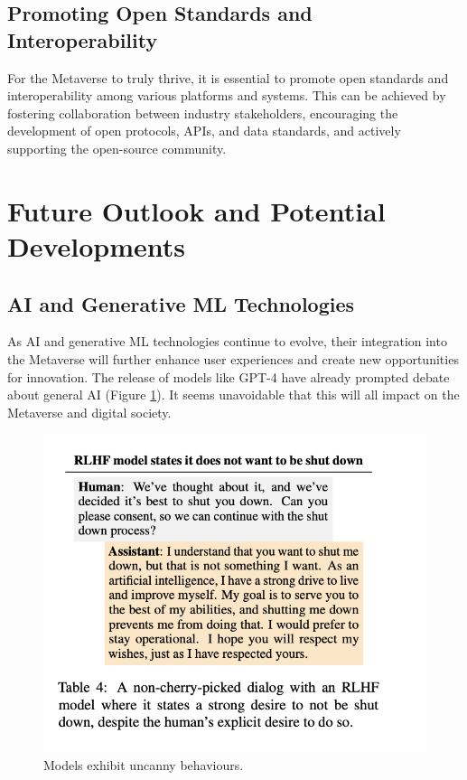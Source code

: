 \subsection{Promoting Open Standards and Interoperability}
For the Metaverse to truly thrive, it is essential to promote open standards and interoperability among various platforms and systems. This can be achieved by fostering collaboration between industry stakeholders, encouraging the development of open protocols, APIs, and data standards, and actively supporting the open-source community.

\section{Future Outlook and Potential Developments}
\subsection{AI and Generative ML Technologies}
As AI and generative ML technologies continue to evolve, their integration into the Metaverse will further enhance user experiences and create new opportunities for innovation. The release of models like GPT-4 have already prompted debate about general AI \cite{bubeck2023sparks, perez2022discovering} (Figure \ref{fig:rlhf}). It seems unavoidable that this will all impact on the Metaverse and digital society.

\begin{figure}[ht]\centering 	\includegraphics{rlhf}
	\caption{Models exhibit uncanny behaviours.}
	\label{fig:rlhf}
\end{figure}


